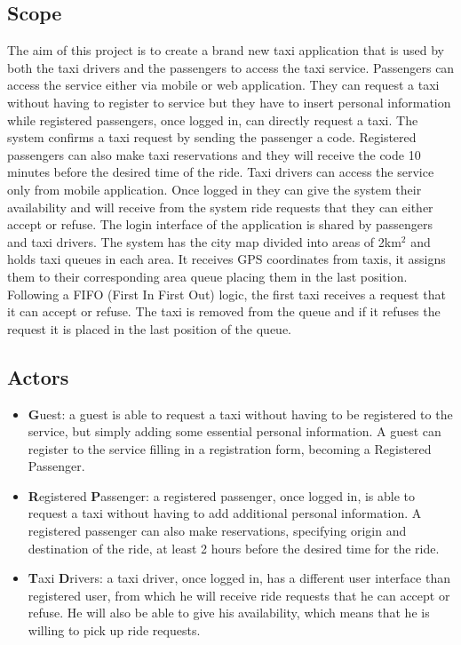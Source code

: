 \documentclass[11pt,a4paper,titlepage]{article}
\begin{document}
\subsection{Scope}
The aim of this project is to create a brand new taxi application that is used by both the taxi drivers and the passengers to access the taxi service. Passengers can access the service either via mobile or web application. They can request a taxi without having to register to service but they have to insert personal information while registered passengers, once logged in, can directly request a taxi. The system confirms a taxi request by sending the passenger a code. Registered passengers can also make taxi reservations and they will receive the code 10 minutes before the desired time of the ride. Taxi drivers can access the service only from mobile application. Once logged in they can give the system their availability and will receive from the system ride requests that they can either accept or refuse. The login interface of the application is shared by passengers and taxi drivers.
The system has the city map divided into areas of 2km$^{2}$ and holds taxi queues in each area. It receives GPS coordinates from taxis, it assigns them to their corresponding area queue placing them in the last position. Following a FIFO (First In First Out) logic, the first taxi receives a request that it can accept or refuse. The taxi is removed from the queue and if it refuses the request it is placed in the last position of the queue.
\subsection{Actors}
\begin{itemize}
	\item \textbf{G}uest: a guest is able to request a taxi without having to be registered to the service, but simply adding some essential personal information. A guest can register to the service filling in a registration form, becoming a Registered Passenger.
	\item \textbf{R}egistered \textbf{P}assenger: a registered passenger, once logged in, is able to request a taxi without having to add additional personal information. A registered passenger can also make reservations, specifying origin and destination of the ride, at least 2 hours before the desired time for the ride.
	\item \textbf{T}axi \textbf{D}rivers: a taxi driver, once logged in, has a different user interface than registered user, from which he will receive ride requests that he can accept or refuse. He will also be able to give his availability, which means that he is willing to pick up ride requests.
\end{itemize}
\end{document}
